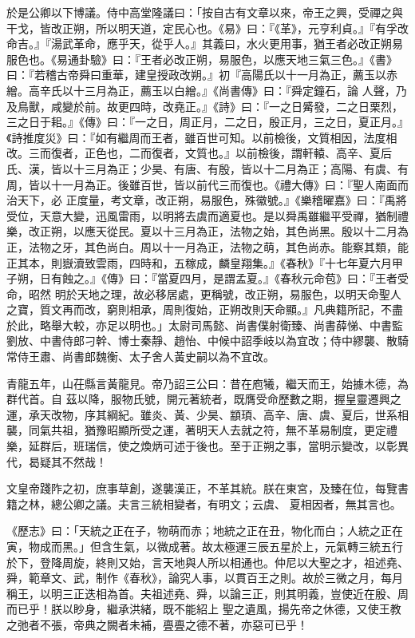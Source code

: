 \begin{pinyinscope}
 於是公卿以下博議。侍中高堂隆議曰：「按自古有文章以來，帝王之興，受禪之與干戈，皆改正朔，所以明天道，定民心也。《易》曰：『《革》，元亨利貞。』『有孚改命吉。』『湯武革命，應乎天，從乎人。』其義曰，水火更用事，猶王者必改正朔易服色也。《易通卦驗》曰：『王者必改正朔，易服色，以應天地三氣三色。』《書》曰：『若稽古帝舜曰重華，建皇授政改朔。』初『高陽氏以十一月為正，薦玉以赤繒。高辛氏以十三月為正，薦玉以白繒。』《尚書傳》曰：『舜定鐘石，論
 人聲，乃及鳥獸，咸變於前。故更四時，改堯正。』《詩》曰：『一之日觱發，二之日栗烈，三之日于耜。』《傳》曰：『一之日，周正月，二之日，殷正月，三之日，夏正月。』《詩推度災》曰：『如有繼周而王者，雖百世可知。以前檢後，文質相因，法度相改。三而復者，正色也，二而復者，文質也。』以前檢後，謂軒轅、高辛、夏后氏、漢，皆以十三月為正；少昊、有唐、有殷，皆以十二月為正；高陽、有虞、有周，皆以十一月為正。後雖百世，皆以前代三而復也。《禮大傳》曰：『聖人南面而治天下，必
 正度量，考文章，改正朔，易服色，殊徽號。』《樂稽曜嘉》曰：『禹將受位，天意大變，迅風雷雨，以明將去虞而適夏也。是以舜禹雖繼平受禪，猶制禮樂，改正朔，以應天從民。夏以十三月為正，法物之始，其色尚黑。殷以十二月為正，法物之牙，其色尚白。周以十一月為正，法物之萌，其色尚赤。能察其類，能正其本，則嶽瀆致雲雨，四時和，五稼成，麟皇翔集。』《春秋》『十七年夏六月甲子朔，日有蝕之。』《傳》曰：『當夏四月，是謂孟夏。』《春秋元命苞》曰：『王者受命，昭然
 明於天地之理，故必移居處，更稱號，改正朔，易服色，以明天命聖人之寶，質文再而改，窮則相承，周則復始，正朔改則天命顯。』凡典籍所記，不盡於此，略舉大較，亦足以明也。」太尉司馬懿、尚書僕射衛臻、尚書薛悌、中書監劉放、中書侍郎刁幹、博士秦靜、趙怡、中候中詔季岐以為宜改；侍中繆襲、散騎常侍王肅、尚書郎魏衡、太子舍人黃史嗣以為不宜改。



 青龍五年，山茌縣言黃龍見。帝乃詔三公曰：昔在庖犧，繼天而王，始據木德，為群代首。自
 茲以降，服物氏號，開元著統者，既膺受命歷數之期，握皇靈遷興之運，承天改物，序其綱紀。雖炎、黃、少昊、顓頊、高辛、唐、虞、夏后，世系相襲，同氣共祖，猶豫昭顯所受之運，著明天人去就之符，無不革易制度，更定禮樂，延群后，班瑞信，使之煥炳可述于後也。至于正朔之事，當明示變改，以彰異代，曷疑其不然哉！



 文皇帝踐阼之初，庶事草創，遂襲漢正，不革其統。朕在東宮，及臻在位，每覽書籍之林，總公卿之議。夫言三統相變者，有明文；云虞、
 夏相因者，無其言也。



 《歷志》曰：「天統之正在子，物萌而赤；地統之正在丑，物化而白；人統之正在寅，物成而黑。」但含生氣，以微成著。故太極運三辰五星於上，元氣轉三統五行於下，登降周旋，終則又始，言天地與人所以相通也。仲尼以大聖之才，祖述堯、舜，範章文、武，制作《春秋》，論究人事，以貫百王之則。故於三微之月，每月稱王，以明三正迭相為首。夫祖述堯、舜，以論三正，則其明義，豈使近在殷、周而已乎！朕以眇身，繼承洪緒，既不能紹上
 聖之遺風，揚先帝之休德，又使王教之弛者不張，帝典之闕者未補，亹亹之德不著，亦惡可已乎！




\end{pinyinscope}
